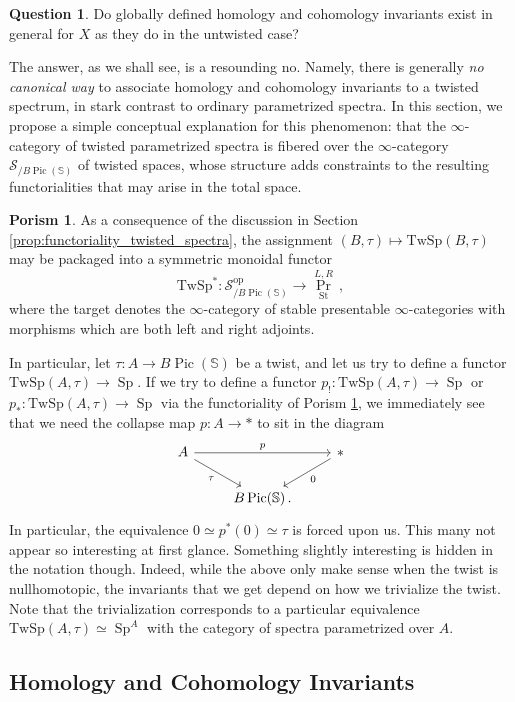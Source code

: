 \documentclass[10pt]{amsart}
\theoremstyle{plain}
\theoremstyle{definition}
\newtheorem{question}[theorem]{Question}
\newtheorem{porism}[theorem]{Porism}
\DeclareMathOperator{\Sp}{Sp}
\DeclareMathOperator{\Pic}{Pic}
\def\on{\operatorname}
\newcommand{\St}{\mathrm{St}}
\newcommand{\oop}{\mathrm{op}}
\newcommand{\bS}{\mathbb{S}}
\newcommand{\TwSp}{\mathrm{TwSp}}
\newcommand{\cS}{\mathcal{S}}
\begin{document}
\begin{question}
Do globally defined homology and cohomology invariants exist in general for $X$ as they do in the untwisted case?
\end{question}

The answer, as we shall see, is a resounding no.
Namely, there is generally \emph{no canonical way} to associate homology and cohomology invariants to a twisted spectrum, in stark contrast to ordinary parametrized spectra.
In this section, we propose a simple conceptual explanation for this phenomenon: that the $\infty$-category of twisted parametrized spectra is fibered over the $\infty$-category $\cS_{/ B \Pic(\bS)}$ of twisted spaces, whose structure adds constraints to the resulting functorialities that may arise in the total space.


\begin{porism} \label{henven}
 As a consequence of the discussion in Section \ref{prop:functoriality_twisted_spectra}, the assignment $(B, \tau) \mapsto \TwSp(B, \tau)$ may be packaged into a symmetric monoidal functor
\[
\TwSp^*:  \cS_{/ B \Pic(\bS)}^{\oop} \to \on{Pr}^{L, R}_{\St}\,,
\]
where the target denotes the $\infty$-category of stable presentable $\infty$-categories with morphisms which are both left and right adjoints.
\end{porism}

In particular, let $\tau: A \to B \Pic(\bS)$ be a twist, and let us try to define a functor $\TwSp(A, \tau) \to \Sp$. If we try to define a functor $p_!: \TwSp(A, \tau) \to \Sp$ or $p_*: \TwSp(A, \tau) \to \Sp$ via the functoriality of Porism  \ref{henven}, we immediately see that we need the collapse map $p: A \to *$ to sit in the diagram
\[
\begin{tikzcd}
  A \arrow[rr,"p"] \arrow[dr,"\tau"'] && * \arrow[dl,"0"] \\
  & B \Pic(\bS) \,. &
\end{tikzcd}
\]
In particular, the equivalence $0 \simeq p^*(0) \simeq \tau$ is forced upon us.
This many not appear so interesting at first glance.
Something slightly interesting is hidden in the notation though.
Indeed, while the above only make sense when the twist is nullhomotopic, the invariants that we get depend on how we trivialize the twist.
Note that the trivialization corresponds to a particular equivalence $\TwSp(A,\tau) \simeq \Sp^{A}$ with the category of spectra parametrized over $A$.

\subsection{Homology and Cohomology Invariants}
\end{document}
